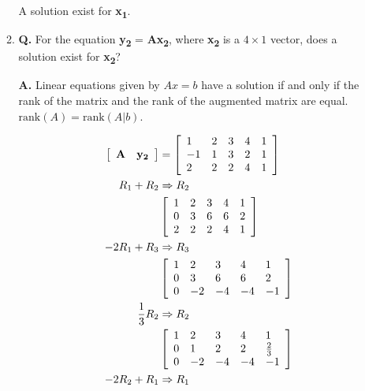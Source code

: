 \documentclass[main.tex]{subfiles}
\begin{document}
\begin{enumerate}
\begin{enumerate}
    A solution exist for \textbf{x\textsubscript{1}}.
    
    \item \textbf{Q.} For the equation \textbf{y\textsubscript{2}} = \textbf{A}\textbf{x\textsubscript{2}}, where \textbf{x\textsubscript{2}} is a $4\times1$ vector, does a solution exist for \textbf{x\textsubscript{2}}?
    
    \textbf{A.} Linear equations given by $Ax = b$ have a solution if and only if the rank of the matrix and the rank of the augmented matrix are equal. $\text{rank}(A)=\text{rank}(A|b)$. 

    \begin{equation}
    \begin{aligned}
        \left[\begin{array}{ll} \textbf{A} & \textbf{y\textsubscript{2}}\end{array}\right] & =
        \left[\begin{array}{lllll}
        1 & 2 & 3 & 4 & 1 \\
        -1 & 1 & 3 & 2 & 1 \\
        2 & 2 & 2 & 4 & 1
        \end{array}\right]\\
        R_1 + R_2 & \Rightarrow R_2\\
        & \left[\begin{array}{lllll}
        1 & 2 & 3 & 4 & 1 \\
        0 & 3 & 6 & 6 & 2 \\
        2 & 2 & 2 & 4 & 1
        \end{array}\right]\\
        -2R_1 + R_3 & \Rightarrow R_3\\
        & \left[\begin{array}{lllll}
        1 & 2 & 3 & 4 & 1 \\
        0 & 3 & 6 & 6 & 2 \\
        0 & -2 & -4 & -4 & -1
        \end{array}\right]\\
        \frac{1}{3}R_2 & \Rightarrow R_2\\
        & \left[\begin{array}{lllll}
        1 & 2 & 3 & 4 & 1 \\
        0 & 1 & 2 & 2 & \frac{2}{3} \\
        0 & -2 & -4 & -4 & -1
        \end{array}\right]\\
        -2R_2 + R_1 & \Rightarrow R_1\\

\end{aligned}
\end{equation}
\end{enumerate}
\end{enumerate}
\end{document}
